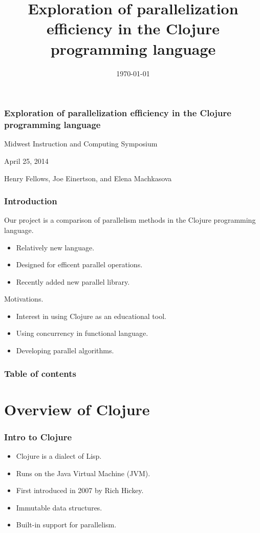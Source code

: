 \documentclass{beamer}
\begin{document}
\title{Exploration of parallelization efficiency in the Clojure programming language}
\date{\today}

\begin{frame}
\frametitle{Exploration of parallelization efficiency in the Clojure programming language}
{\centering
Midwest Instruction and Computing Symposium\par
April 25, 2014\par
Henry Fellows, Joe Einertson, and Elena Machkasova\par
}
\end{frame}

\begin{frame}[fragile]
\frametitle{Introduction}
	Our project is a comparison of parallelism methods in the Clojure programming language.
	\begin{itemize}
	\item Relatively new language.
	\item Designed for efficent parallel operations.
	\item Recently added new parallel library.
	\end{itemize}
	Motivations.
	\begin{itemize}
	\item Interest in using Clojure as an educational tool.
	\item Using concurrency in functional language.
	\item Developing parallel algorithms.
	\end{itemize}
	
\end{frame}

\begin{frame}
\frametitle{Table of contents}
\tableofcontents %
\end{frame}
\section{Overview of Clojure}

\begin{frame}[fragile]
\frametitle{Intro to Clojure}
	\begin{itemize}
  	 \item Clojure is a dialect of Lisp.
	 \item Runs on the Java Virtual Machine (JVM).
  	 \item First introduced in 2007 by Rich Hickey.
  	 \item Immutable data structures.
	 \item Built-in support for parallelism.
	 \end{itemize}
\end{frame}
\end{document}
